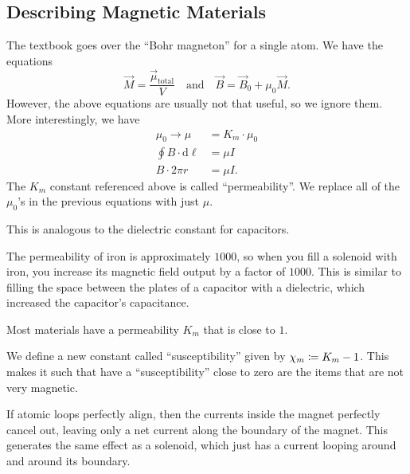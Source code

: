 \documentclass[class=article, crop=false]{standalone}
\begin{document}
  \subsection{Describing Magnetic Materials}
  The textbook goes over the ``Bohr magneton'' for a single atom. We have the equations 
  \[
    \vec{M} = \frac{\vec{\mu}_\text{total}}{V}\quad \text{and} \quad \vec{B} = \vec{B}_0 + \mu_0\vec{M}.
  \]
  However, the above equations are usually not that useful, so we ignore them. More interestingly, we have
  \begin{align*}
    \mu_0\to \mu &= K_m\cdot \mu_0 \\
    \oint B\cdot \mathrm{d}\ell &= \mu I \\
    B\cdot 2\pi r &= \mu I.
  \end{align*}
  The $K_m$ constant referenced above is called ``permeability''. We replace all of the $\mu_0$'s in the previous equations with just $\mu$.
  \begin{note}{}
    This is analogous to the dielectric constant for capacitors.
  \end{note}
  \begin{example}{}
    The permeability of iron is approximately $1000$, so when you fill a solenoid with iron, you increase its magnetic field output by a factor of $1000$. This is similar to filling the space between the plates of a capacitor with a dielectric, which increased the capacitor's capacitance.
  \end{example}
  \begin{note}{}
    Most materials have a permeability $K_m$ that is close to $1$.
  \end{note}
  We define a new constant called ``susceptibility'' given by $\chi_m \coloneqq K_m - 1$. This makes it such that have a ``susceptibility'' close to zero are the items that are not very magnetic. \par
  If atomic loops perfectly align, then the currents inside the magnet perfectly cancel out, leaving only a net current along the boundary of the magnet. This generates the same effect as a solenoid, which just has a current looping around and around its boundary. 
\end{document}
